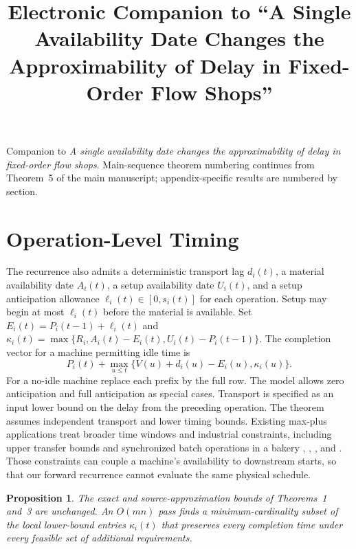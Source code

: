 \documentclass[11pt,letterpaper]{article}
\title{Electronic Companion to ``A Single Availability Date Changes the Approximability of Delay in Fixed-Order Flow Shops''}
\author{}
\date{}
\newtheorem{appprop}{Proposition}[section]
\begin{document}
\onehalfspacing
\maketitle

\appendix

\noindent Companion to \emph{A single availability date changes the approximability of delay in fixed-order flow shops}. Main-sequence theorem numbering continues from Theorem~5 of the main manuscript; appendix-specific results are numbered by section.

\section{Operation-Level Timing}
\label{app:local}

The recurrence also admits a deterministic transport lag $d_i(t)$, a material availability date $A_i(t)$, a setup availability date $U_i(t)$, and a setup anticipation allowance $\ell_i(t)\in[0,s_i(t)]$ for each operation. Setup may begin at most $\ell_i(t)$ before the material is available. Set $E_i(t)=P_i(t-1)+\ell_i(t)$ and $\kappa_i(t)=\max\{R_i,A_i(t)-E_i(t),U_i(t)-P_i(t-1)\}$. The completion vector for a machine permitting idle time is
\[
P_i(t)+\max_{u\le t}\{V(u)+d_i(u)-E_i(u),\kappa_i(u)\}.
\]
For a no-idle machine replace each prefix by the full row. The model allows zero anticipation and full anticipation as special cases. Transport is specified as an input lower bound on the delay from the preceding operation. The theorem assumes independent transport and lower timing bounds. Existing max-plus applications treat broader time windows and industrial constraints, including upper transfer bounds and synchronized batch operations in a bakery \citep[][\S3]{Marce2026}, \citet{Wang2007}, \citet[][\S4]{Zorzenon2022}, and \citet{Robillard2024}. Those constraints can couple a machine's availability to downstream starts, so that our forward recurrence cannot evaluate the same physical schedule.

\begin{appprop}
\label{prop:local}
The exact and source-approximation bounds of Theorems~1 and~3 are unchanged. An $O(mn)$ pass finds a minimum-cardinality subset of the local lower-bound entries $\kappa_i(t)$ that preserves every completion time under every feasible set of additional requirements.
\end{appprop}
\end{document}
